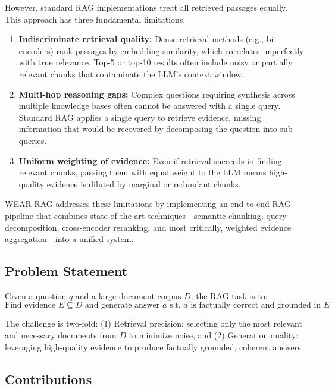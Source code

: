 \documentclass[twocolumn,11pt]{article}
\begin{document}
However, standard RAG implementations treat all retrieved passages equally. This approach has three fundamental limitations:

\begin{enumerate}
\item \textbf{Indiscriminate retrieval quality:} Dense retrieval methods (e.g., bi-encoders) rank passages by embedding similarity, which correlates imperfectly with true relevance. Top-5 or top-10 results often include noisy or partially relevant chunks that contaminate the LLM's context window.

\item \textbf{Multi-hop reasoning gaps:} Complex questions requiring synthesis across multiple knowledge bases often cannot be answered with a single query. Standard RAG applies a single query to retrieve evidence, missing information that would be recovered by decomposing the question into sub-queries.

\item \textbf{Uniform weighting of evidence:} Even if retrieval succeeds in finding relevant chunks, passing them with equal weight to the LLM means high-quality evidence is diluted by marginal or redundant chunks.
\end{enumerate}

WEAR-RAG addresses these limitations by implementing an end-to-end RAG pipeline that combines state-of-the-art techniques---semantic chunking, query decomposition, cross-encoder reranking, and most critically, weighted evidence aggregation---into a unified system.

\subsection{Problem Statement}

Given a question $q$ and a large document corpus $D$, the RAG task is to:
\begin{equation}
\text{Find evidence } E \subseteq D \text{ and generate answer } a \text{ s.t. } a \text{ is factually correct and grounded in } E
\end{equation}

The challenge is two-fold: (1) Retrieval precision: selecting only the most relevant and necessary documents from $D$ to minimize noise, and (2) Generation quality: leveraging high-quality evidence to produce factually grounded, coherent answers.

\subsection{Contributions}
\end{document}

